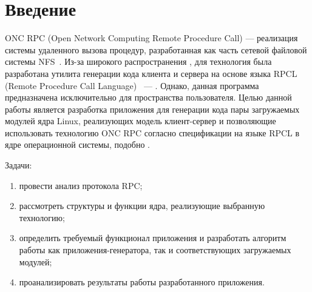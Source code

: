 \section*{Введение}

ONC RPC (Open Network Computing Remote Procedure Call) --- реализация системы
удаленного вызова процедур, разработанная как часть сетевой файловой системы
NFS~\cite{rfc1094}. Из-за широкого распространения \cite{rfc5531}, для
технология была разработана утилита генерации кода клиента и сервера на основе
языка RPCL (Remote Procedure Call Language)~\cite{rfc5531} --- .
Однако, данная программа предназначена исключительно для пространства
пользователя. Целью данной работы является разработка приложения для генерации
кода пары загружаемых модулей ядра Linux, реализующих модель клиент-сервер и
позволяющие использовать технологию ONC RPC согласно спецификации на языке RPCL
в ядре операционной системы, подобно .

Задачи:
\begin{enumerate}
    \item провести анализ протокола RPC;
    \item рассмотреть структуры и функции ядра, реализующие выбранную
          технологию;
    \item определить требуемый функционал приложения и разработать алгоритм
          работы как приложения-генератора, так и соответствующих загружаемых
          модулей;
    \item проанализировать результаты работы разработанного приложения.
\end{enumerate}

\pagebreak

